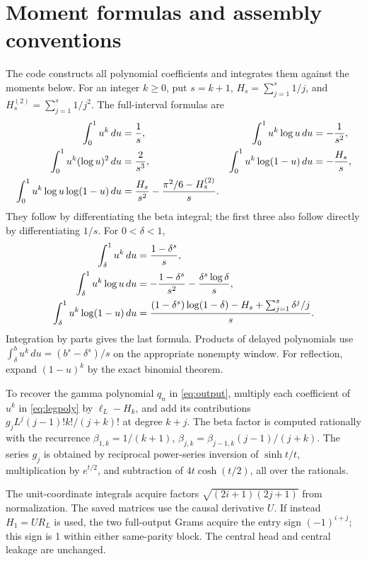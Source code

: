 \documentclass[11pt]{article}
\numberwithin{equation}{section}
\theoremstyle{definition}
\theoremstyle{remark}
\begin{document}
\appendix
\section{Moment formulas and assembly conventions}\label{app:moments}

The code constructs all polynomial coefficients and integrates them against
the moments below. For an integer $k\ge0$, put $s=k+1$,
$H_s=\sum_{j=1}^s1/j$, and $H_s^{(2)}=\sum_{j=1}^s1/j^2$.
The full-interval formulas are
\begin{align}
 \int_0^1u^k\,du&=\frac1s,&
 \int_0^1u^k\log u\,du&=-\frac1{s^2},\notag\\
 \int_0^1u^k(\log u)^2\,du&=\frac2{s^3},&
 \int_0^1u^k\log(1-u)\,du&=-\frac{H_s}{s},\label{eq:moments}\\
 \int_0^1u^k\log u\log(1-u)\,du
 &=\frac{H_s}{s^2}-\frac{\pi^2/6-H_s^{(2)}}s.\notag
\end{align}
They follow by differentiating the beta integral; the first three also
follow directly by differentiating $1/s$.
For $0<\delta<1$,
\begin{align}
 \int_\delta^1u^k\,du&=\frac{1-\delta^s}s,\notag\\
 \int_\delta^1u^k\log u\,du
 &=-\frac{1-\delta^s}{s^2}-\frac{\delta^s\log\delta}s,\label{eq:tailmoments}\\
 \int_\delta^1u^k\log(1-u)\,du
 &=\frac{(1-\delta^s)\log(1-\delta)-H_s+\sum_{j=1}^s\delta^j/j}{s}.
 \notag
\end{align}
Integration by parts gives the last formula. Products of delayed
polynomials use
$\int_\delta^b u^k\,du=(b^s-\delta^s)/s$ on the appropriate nonempty
window. For reflection, expand $(1-u)^k$ by the exact binomial theorem.

To recover the gamma polynomial $q_n$ in \eqref{eq:output}, multiply each
coefficient of $u^k$ in \eqref{eq:legpoly} by $\ell_L-H_k$, and add
its contributions $g_jL^j(j-1)!k!/(j+k)!$ at degree $k+j$.
The beta factor is computed rationally with the recurrence
$\beta_{1,k}=1/(k+1)$,
$\beta_{j,k}=\beta_{j-1,k}(j-1)/(j+k)$.
The series $g_j$ is obtained by reciprocal power-series inversion of
$\sinh t/t$, multiplication by $e^{t/2}$, and subtraction of
$4t\cosh(t/2)$, all over the rationals.

The unit-coordinate integrals acquire factors $\sqrt{(2i+1)(2j+1)}$ from
normalization. The saved matrices use the causal derivative $U$.
If instead $H_1=UR_L$ is used, the two full-output Grams acquire the
entry sign $(-1)^{i+j}$; this sign is 1 within either same-parity block.
The central head and central leakage are unchanged.
\end{document}
